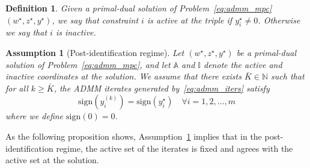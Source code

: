 \documentclass[letterpaper, 10 pt, conference]{ieeeconf}  %
\newtheorem{assumption}{Assumption}
\newtheorem{definition}{Definition}
\begin{document}
\begin{definition}
Given a primal-dual solution of Problem~\eqref{eq:admm_mpc} $(w^{\star}, z^{\star}, y^{\star})$, we say that constraint $i$ is active at the triple if $y_i^{\star} \neq 0$. Otherwise we say that $i$ is inactive.
\end{definition}
\begin{assumption}[Post-identification regime]
\label{assumption:1}
Let $(w^{\star}, z^{\star}, y^{\star})$ be a primal-dual solution of Problem~\eqref{eq:admm_mpc}, and let $\mathbb{A}$ and $\mathbb{I}$ denote the active and inactive coordinates at the solution. We assume that there exists $\bar{K} \in \mathbb{N}$ such that for all $k \geq \bar{K}$, the ADMM iterates generated by~\eqref{eq:admm_iters} satisfy
\begin{equation}
\label{eq:assumtion_1}
\text{sign}(y_i^{(k)}) = \text{sign}(y_i^{\star}) \quad \forall i =1,2,\dots, m
\end{equation}
where we define $\text{sign}(0) = 0$.
\end{assumption}

As the following proposition shows, Assumption~\ref{assumption:1} implies that in the post-identification regime, the active set of the iterates is fixed and agrees with the active set at the solution.
\end{document}
